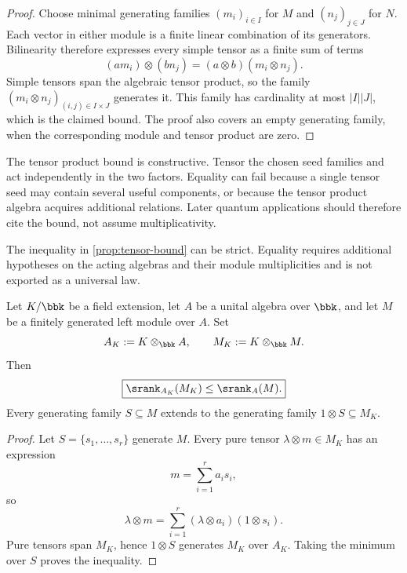 \begin{proof}
Choose minimal generating families $(m_i)_{i\in I}$ for $M$ and $(n_j)_{j\in J}$ for $N$. Each vector in either module is a finite linear combination of its generators. Bilinearity therefore expresses every simple tensor as a finite sum of terms
\[
(am_i)\otimes(bn_j)=(a\otimes b)(m_i\otimes n_j).
\]
Simple tensors span the algebraic tensor product, so the family $(m_i\otimes n_j)_{(i,j)\in I\times J}$ generates it. This family has cardinality at most $|I||J|$, which is the claimed bound. The proof also covers an empty generating family, when the corresponding module and tensor product are zero.
\end{proof}

\begin{interpretation}
The tensor product bound is constructive.  Tensor the chosen seed families and act independently in the two factors.  Equality can fail because a single tensor seed may contain several useful components, or because the tensor product algebra acquires additional relations.  Later quantum applications should therefore cite the bound, not assume multiplicativity.
\end{interpretation}


\begin{boundary}
\label{bnd:tensor-nonequality}
The inequality in \cref{prop:tensor-bound} can be strict.  Equality requires additional hypotheses on the acting algebras and their module multiplicities and is not exported as a universal law.
\end{boundary}



\begin{proposition}
\label{prop:scalar-extension}
Let \(K/\bbk\) be a field extension, let \(A\) be a unital algebra over \(\bbk\), and let \(M\) be a finitely generated left module over \(A\).  Set
\[
A_K:=K\otimes_{\bbk}A,
\qquad
M_K:=K\otimes_{\bbk}M.
\]
Then
\[
\boxed{
\srank_{A_K}(M_K)\leq\srank_A(M).
}
\]
Every generating family \(S\subseteq M\) extends to the generating family \(1\otimes S\subseteq M_K\).
\end{proposition}

\begin{proof}
Let \(S=\{s_1,\ldots,s_r\}\) generate \(M\).  Every pure tensor \(\lambda\otimes m\in M_K\) has an expression
\[
m=\sum_{i=1}^r a_is_i,
\]
so
\[
\lambda\otimes m
=
\sum_{i=1}^r(\lambda\otimes a_i)(1\otimes s_i).
\]
Pure tensors span \(M_K\), hence \(1\otimes S\) generates \(M_K\) over \(A_K\).  Taking the minimum over \(S\) proves the inequality.
\end{proof}

